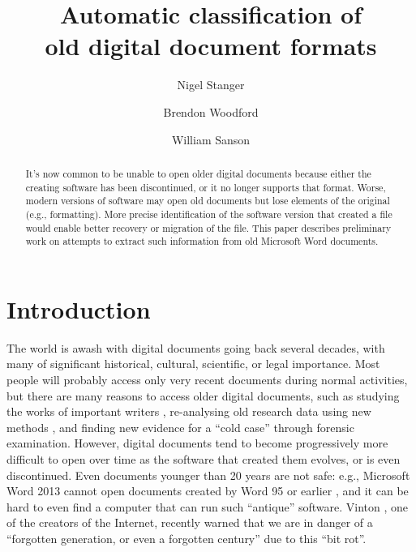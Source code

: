 \documentclass[12pt]{article}
\title{Automatic classification of \\ old digital document formats}
\author{Nigel Stanger \and Brendon Woodford \and William Sanson}
\begin{document}
\maketitle
\thispagestyle{empty}

\begin{abstract}
It’s now common to be unable to open older digital documents because either the creating software has been discontinued, or it no longer supports that format. Worse, modern versions of software may open old documents but lose elements of the original (e.g., formatting). More precise identification of the software version that created a file would enable better recovery or migration of the file. This paper describes preliminary work on attempts to extract such information from old Microsoft Word documents.
\end{abstract}

\section{Introduction}

The world is awash with digital documents going back several decades, with many of significant historical, cultural, scientific, or legal importance. Most people will probably access only very recent documents during normal activities, but there are many reasons to access older digital documents, such as studying the works of important writers \cite{Kolowich.S-2009a-Archiving}, re-analysing old research data using new methods \cite{Mount.R-2009a-Data,Pringle.H-2010a-NASA}, and finding new evidence for a “cold case” through forensic examination. However, digital documents tend to become progressively more difficult to open over time as the software that created them evolves, or is even discontinued. Even documents younger than 20 years are not safe: e.g., Microsoft Word 2013 cannot open documents created by Word 95 or earlier \cite{Microsoft-2014a-Word2013}, and it can be hard to even find a computer that can run such “antique” software. Vinton , one of the creators of the Internet, recently warned that we are in danger of a “forgotten generation, or even a forgotten century” due to this “bit rot”.
\end{document}
